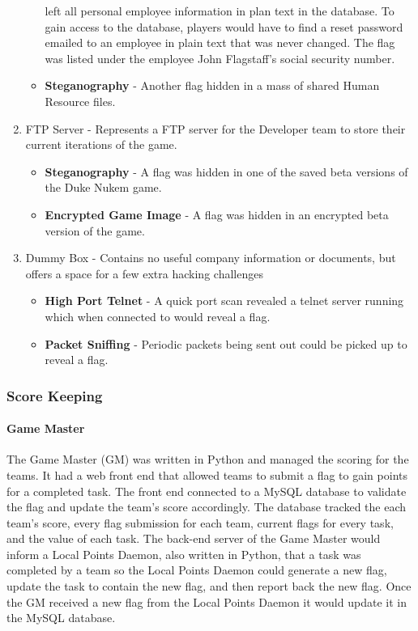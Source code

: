 \documentclass[10pt]{article}
\begin{document}
\begin{enumerate}
\begin{itemize}
        left all personal employee information in plan text in the database. To
        gain access to the database, players would have to find a reset password
        emailed to an employee in plain text that was never changed. The flag
        was listed under the employee John Flagstaff's social security number.
        \item \textbf{Steganography} - Another flag hidden in a mass of shared
        Human Resource files.        
      \end{itemize}
  \item FTP Server - Represents a FTP server for the Developer team to store
  their current iterations of the game.
      \begin{itemize}
        \item \textbf{Steganography} - A flag was hidden in one of the saved
        beta versions of the Duke Nukem game.
        \item \textbf{Encrypted Game Image} - A flag was hidden in an encrypted
        beta version of the game.
      \end{itemize}
   \item Dummy Box - Contains no useful company information or documents, but
   offers a space for a few extra hacking challenges
      \begin{itemize}
        \item \textbf{High Port Telnet} - A quick port scan revealed a telnet
        server running which when connected to would reveal a flag.
        \item \textbf{Packet Sniffing} - Periodic packets being sent out
        could be picked up to reveal a flag.
      \end{itemize}
\end{enumerate}

\subsubsection{Score Keeping}

\paragraph*{Game Master}
The Game Master (GM) was written in Python and managed the scoring for the
teams. It had a web front end that allowed teams to submit a flag to gain points
for a completed task. The front end connected to a MySQL database to validate
the flag and update the team's score accordingly. The database tracked the
each team's score, every flag submission for each team, current flags for every
task, and the value of each task. The back-end server of the Game Master would
inform a Local Points Daemon, also written in Python, that a task was completed
by a team so the Local Points Daemon could generate a new flag, update the task to contain the
new flag, and then report back the new flag. Once the GM received a new flag
from the Local Points Daemon it would update it in the MySQL database.
\end{document}
